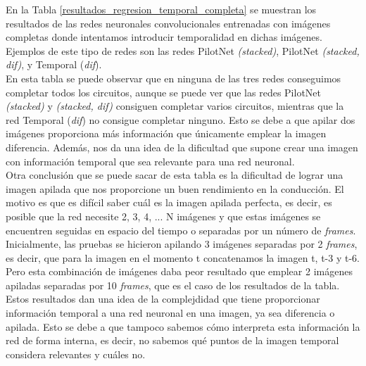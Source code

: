 En la Tabla \ref{resultados_regresion_temporal_completa} se muestran los resultados de las redes neuronales convolucionales entrenadas con imágenes completas donde intentamos introducir temporalidad en dichas imágenes. Ejemplos de este tipo de redes son las redes PilotNet \textit{(stacked)}, PilotNet \textit{(stacked, dif)}, y Temporal (\textit{dif}).\\

En esta tabla se puede observar que en ninguna de las tres redes conseguimos completar todos los circuitos, aunque se puede ver que las redes PilotNet \textit{(stacked)} y \textit{(stacked, dif)} consiguen completar varios circuitos, mientras que la red Temporal (\textit{dif}) no consigue completar ninguno. Esto se debe a que apilar dos imágenes proporciona más información que únicamente emplear la imagen diferencia. Además, nos da una idea de la dificultad que supone crear una imagen con información temporal que sea relevante para una red neuronal.\\

Otra conclusión que se puede sacar de esta tabla es la dificultad de lograr una imagen apilada que nos proporcione un buen rendimiento en la conducción. El motivo es que es difícil saber cuál es la imagen apilada perfecta, es decir, es posible que la red necesite 2, 3, 4, ... N imágenes y que estas imágenes se encuentren seguidas en espacio del tiempo o separadas por un número de \textit{frames}. Inicialmente, las pruebas se hicieron apilando 3 imágenes separadas por 2 \textit{frames}, es decir, que para la imagen en el momento t concatenamos la imagen t, t-3 y t-6. Pero esta combinación de imágenes daba peor resultado que emplear 2 imágenes apiladas separadas por 10 \textit{frames}, que es el caso de los resultados de la tabla.\\

Estos resultados dan una idea de la complejdidad que tiene proporcionar información temporal a una red neuronal en una imagen, ya sea diferencia o apilada. Esto se debe a que tampoco sabemos cómo interpreta esta información la red de forma interna, es decir, no sabemos qué puntos de la imagen temporal considera relevantes y cuáles no.\\


